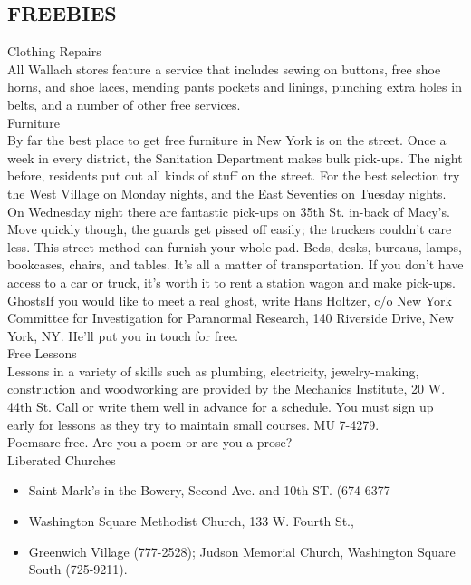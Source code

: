 \documentclass[11pt,twoside,a4paper]{book}
\begin{document}
\subsection{FREEBIES}
Clothing Repairs~\\
All Wallach stores feature a service that includes sewing on buttons, free shoe horns, and shoe laces, mending pants pockets and linings, punching extra holes in belts, and a number of other free services.~\\

Furniture~\\
By far the best place to get free furniture in New York is on the street. Once a week in every district, the Sanitation Department makes bulk pick-ups. The night before, residents put out all kinds of stuff on the street. For the best selection try the West Village on Monday nights, and the East Seventies on Tuesday nights. On Wednesday night there are fantastic pick-ups on 35th St. in-back of Macy's. Move quickly though, the guards get pissed off easily; the truckers couldn't care less. This street method can furnish your whole pad. Beds, desks, bureaus, lamps, bookcases, chairs, and tables. It's all a matter of transportation. If you don't have access to a car or truck, it's worth it to rent a station wagon and make pick-ups. GhostsIf you would like to meet a real ghost, write Hans Holtzer, c/o New York Committee for Investigation for Paranormal Research, 140 Riverside Drive, New York, NY. He'll put you in touch for free.~\\

Free Lessons~\\
Lessons in a variety of skills such as plumbing, electricity, jewelry-making, construction and woodworking are provided by the Mechanics Institute, 20 W. 44th St. Call or write them well in advance for a schedule. You must sign up early for lessons as they try to maintain small courses. MU 7-4279.~\\

Poemsare free.  Are you a poem or are you a prose? ~\\

Liberated Churches ~\\
\begin{itemize}
\item Saint Mark's in the Bowery, Second Ave. and 10th ST. (674-6377 
\item Washington Square Methodist Church, 133 W. Fourth St.,  
\item Greenwich Village (777-2528); Judson Memorial Church, Washington Square South (725-9211).
\end{itemize}
\end{document}
